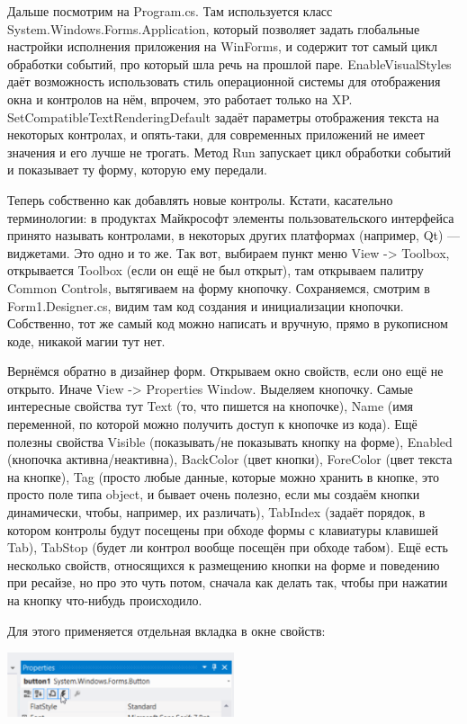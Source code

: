\documentclass{../../text-style}
\begin{document}
Дальше посмотрим на Program.cs. Там используется класс System.Windows.Forms.Application, который позволяет задать глобальные настройки исполнения приложения на WinForms, и содержит тот самый цикл обработки событий, про который шла речь на прошлой паре. EnableVisualStyles даёт возможность использовать стиль операционной системы для отображения окна и контролов на нём, впрочем, это работает только на XP. SetCompatibleTextRenderingDefault задаёт параметры отображения текста на некоторых контролах, и опять-таки, для современных приложений не имеет значения и его лучше не трогать. Метод Run запускает цикл обработки событий и показывает ту форму, которую ему передали.

Теперь собственно как добавлять новые контролы. Кстати, касательно терминологии: в продуктах Майкрософт элементы пользовательского интерфейса принято называть контролами, в некоторых других платформах (например, Qt) --- виджетами. Это одно и то же. Так вот, выбираем пункт меню View -> Toolbox, открывается Toolbox (если он ещё не был открыт), там открываем палитру Common Controls, вытягиваем на форму кнопочку. Сохраняемся, смотрим в Form1.Designer.cs, видим там код создания и инициализации кнопочки. Собственно, тот же самый код можно написать и вручную, прямо в рукописном коде, никакой магии тут нет. 

Вернёмся обратно в дизайнер форм. Открываем окно свойств, если оно ещё не открыто. Иначе View -> Properties Window. Выделяем кнопочку. Самые интересные свойства тут Text (то, что пишется на кнопочке), Name (имя переменной, по которой можно получить доступ к кнопочке из кода). Ещё полезны свойства Visible (показывать/не показывать кнопку на форме), Enabled (кнопочка активна/неактивна), BackColor (цвет кнопки), ForeColor (цвет текста на кнопке), Tag (просто любые данные, которые можно хранить в кнопке, это просто поле типа object, и бывает очень полезно, если мы создаём кнопки динамически, чтобы, например, их различать), TabIndex (задаёт порядок, в котором контролы будут посещены при обходе формы с клавиатуры клавишей Tab), TabStop (будет ли контрол вообще посещён при обходе табом). Ещё есть несколько свойств, относящихся к размещению кнопки на форме и поведению при ресайзе, но про это чуть потом, сначала как делать так, чтобы при нажатии на кнопку что-нибудь происходило.

Для этого применяется отдельная вкладка в окне свойств:

\begin{center}
    \includegraphics[width=0.5\textwidth]{events.png}
\end{center}
\end{document}
